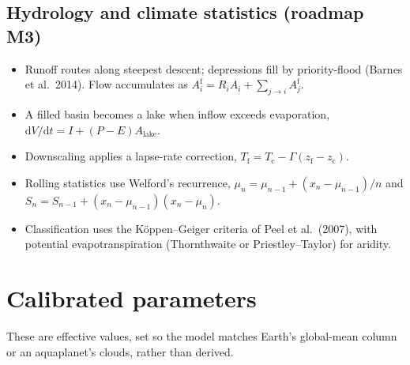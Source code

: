 \documentclass[11pt,a4paper]{article}
\newcommand{\dd}{\mathrm{d}}
\begin{document}
\subsection{Hydrology and climate statistics (roadmap M3)}
\begin{itemize}
\item Runoff routes along steepest descent; depressions fill by priority-flood (Barnes
  et al.\ 2014). Flow accumulates as
  $A_i^{\mathrm{f}} = R_iA_i + \sum_{j\to i}A_j^{\mathrm{f}}$.
\item A filled basin becomes a lake when inflow exceeds evaporation,
  $\dd V/\dd t = I + (P-E)A_{\mathrm{lake}}$.
\item Downscaling applies a lapse-rate correction, $T_{\mathrm{f}} = T_{\mathrm{c}} -
  \Gamma(z_{\mathrm{f}} - z_{\mathrm{c}})$.
\item Rolling statistics use Welford's recurrence,
  $\mu_n = \mu_{n-1} + (x_n-\mu_{n-1})/n$ and
  $S_n = S_{n-1} + (x_n-\mu_{n-1})(x_n-\mu_n)$.
\item Classification uses the K\"oppen--Geiger criteria of Peel et al.\ (2007), with
  potential evapotranspiration (Thornthwaite or Priestley--Taylor) for aridity.
\end{itemize}

\appendix

\section{Calibrated parameters}\label{app:calibrated}

These are effective values, set so the model matches Earth's global-mean column or
an aquaplanet's clouds, rather than derived.
\end{document}
